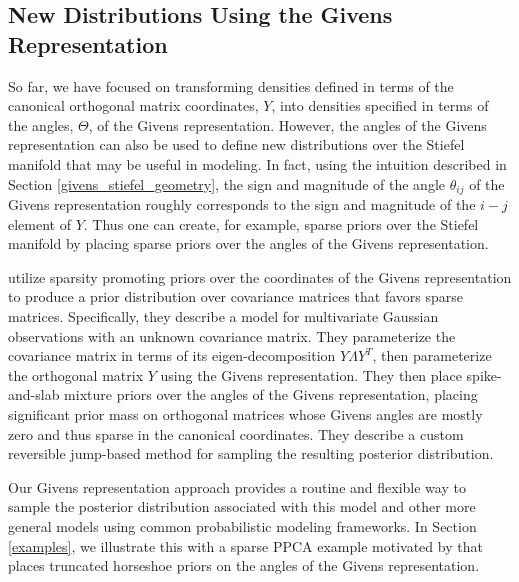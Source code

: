 \documentclass[ba]{imsart}
\numberwithin{equation}{section}
\theoremstyle{plain}
\begin{document}
\subsection{New Distributions Using the Givens Representation}
So far, we have focused on transforming densities defined in terms of the canonical orthogonal matrix coordinates, $Y$, into densities specified in terms of the angles, $\Theta$, of the Givens representation. However, the angles of the Givens representation can also be used to define new distributions over the Stiefel manifold that may be useful in modeling. In fact, using the intuition described in Section \ref{givens_stiefel_geometry}, the sign and magnitude of the angle $\theta_{ij}$ of the Givens representation roughly corresponds to the sign and magnitude of the $i-j$ element of $Y$. Thus one can create, for example, sparse priors over the Stiefel manifold by placing sparse priors over the angles of the Givens representation.

\noindent \cite{cron2016models} utilize sparsity promoting priors over the coordinates of the Givens representation to produce a prior distribution over covariance matrices that favors sparse matrices. Specifically, they describe a model for multivariate Gaussian observations with an unknown covariance matrix. They parameterize the covariance matrix in terms of its eigen-decomposition $Y \Lambda Y^T$, then parameterize the orthogonal matrix $Y$ using the Givens representation. They then place spike-and-slab mixture priors over the angles of the Givens representation, placing significant prior mass on orthogonal matrices whose Givens angles are mostly zero and thus sparse in the canonical coordinates. They describe a custom reversible jump-based method for sampling the resulting posterior distribution.

\noindent Our Givens representation approach provides a routine and flexible way to sample the posterior distribution associated with this model and other more general models using common probabilistic modeling frameworks. In Section \ref{examples}, we illustrate this with a sparse PPCA example motivated by \cite{cron2016models} that places truncated horseshoe priors on the angles of the Givens representation.


\end{document}
